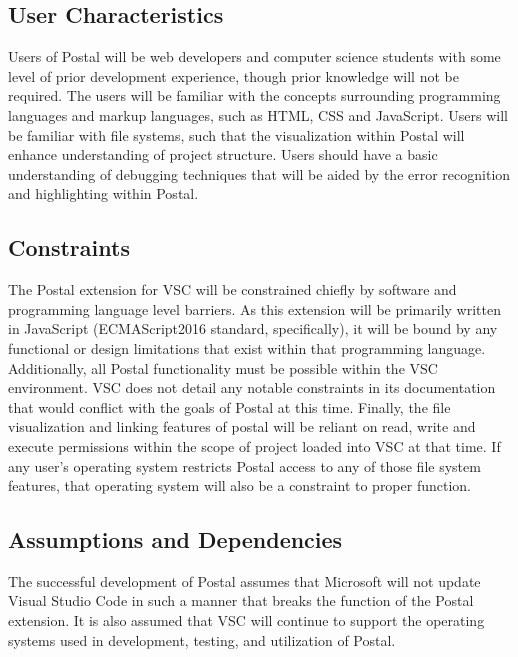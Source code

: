 \documentclass[letterpaper,10pt,titlepage,draftclsnofoot,onecolumn,onesided] {IEEEtran}
\begin{document}
\subsection{User Characteristics}
Users of Postal will be web developers and computer science students with some level of prior development experience, though prior knowledge will not be required. The users will be familiar with the concepts surrounding programming languages and markup languages, such as HTML, CSS and JavaScript. Users will be familiar with file systems, such that the visualization within Postal will enhance understanding of project structure. Users should have a basic understanding of debugging techniques that will be aided by the error recognition and highlighting within Postal.

\subsection{Constraints}
The Postal extension for VSC will be constrained chiefly by software and programming language level barriers. As this extension will be primarily written in JavaScript (ECMAScript2016 standard, specifically), it will be bound by any functional or design limitations that exist within that programming language. Additionally, all Postal functionality must be possible within the VSC environment. VSC does not detail any notable constraints in its documentation that would conflict with the goals of Postal at this time. Finally, the file visualization and linking features of postal will be reliant on read, write and execute permissions within the scope of project loaded into VSC at that time. If any user's operating system restricts Postal access to any of those file system features, that operating system will also be a constraint to proper function.

\subsection{Assumptions and Dependencies}
The successful development of Postal assumes that Microsoft will not update Visual Studio Code in such a manner that breaks the function of the Postal extension. It is also assumed that VSC will continue to support the operating systems used in development, testing, and utilization of Postal.
\end{document}
